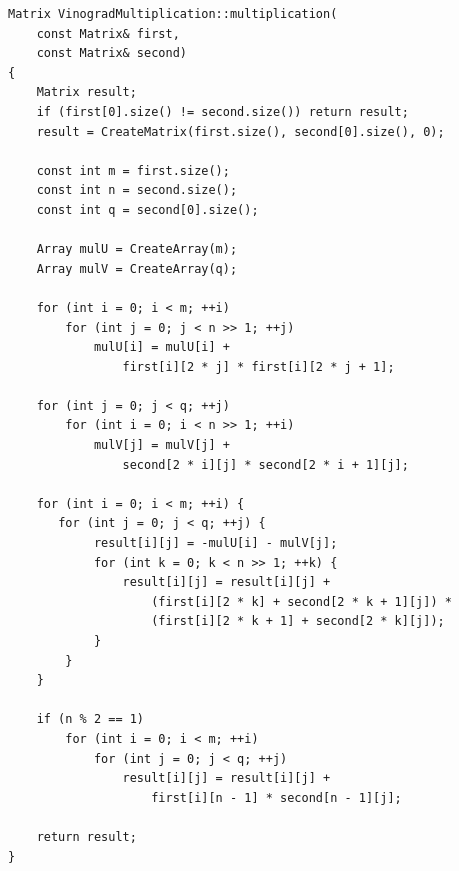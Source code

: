 \documentclass[a4paper,12pt]{article}
\begin{document}
\begin{lstlisting}[caption=Алгоритм Винограда умножения матриц]
Matrix VinogradMultiplication::multiplication(
    const Matrix& first,
    const Matrix& second)
{
    Matrix result;
    if (first[0].size() != second.size()) return result;
    result = CreateMatrix(first.size(), second[0].size(), 0);

    const int m = first.size();
    const int n = second.size();
    const int q = second[0].size();

    Array mulU = CreateArray(m);
    Array mulV = CreateArray(q);

    for (int i = 0; i < m; ++i)
        for (int j = 0; j < n >> 1; ++j)
            mulU[i] = mulU[i] +
                first[i][2 * j] * first[i][2 * j + 1];

    for (int j = 0; j < q; ++j)
        for (int i = 0; i < n >> 1; ++i)
            mulV[j] = mulV[j] +
                second[2 * i][j] * second[2 * i + 1][j];

    for (int i = 0; i < m; ++i) {
       for (int j = 0; j < q; ++j) {
            result[i][j] = -mulU[i] - mulV[j];
            for (int k = 0; k < n >> 1; ++k) {
                result[i][j] = result[i][j] +
                    (first[i][2 * k] + second[2 * k + 1][j]) *
                    (first[i][2 * k + 1] + second[2 * k][j]);
            }
        }
    }

    if (n % 2 == 1)
        for (int i = 0; i < m; ++i)
            for (int j = 0; j < q; ++j)
                result[i][j] = result[i][j] +
                    first[i][n - 1] * second[n - 1][j];

    return result;
}
\end{lstlisting}
\end{document}
